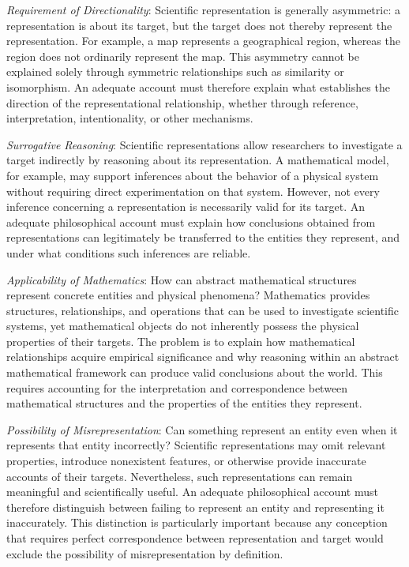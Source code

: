 \emph{Requirement of Directionality}: Scientific representation is generally asymmetric: a representation is about its target, but the target does not thereby represent the representation. For example, a map represents a geographical region, whereas the region does not ordinarily represent the map. This asymmetry cannot be explained solely through symmetric relationships such as similarity or isomorphism. An adequate account must therefore explain what establishes the direction of the representational relationship, whether through reference, interpretation, intentionality, or other mechanisms.

\emph{Surrogative Reasoning}: Scientific representations allow researchers to investigate a target indirectly by reasoning about its representation. A mathematical model, for example, may support inferences about the behavior of a physical system without requiring direct experimentation on that system. However, not every inference concerning a representation is necessarily valid for its target. An adequate philosophical account must explain how conclusions obtained from representations can legitimately be transferred to the entities they represent, and under what conditions such inferences are reliable.

\emph{Applicability of Mathematics}: How can abstract mathematical structures represent concrete entities and physical phenomena? Mathematics provides structures, relationships, and operations that can be used to investigate scientific systems, yet mathematical objects do not inherently possess the physical properties of their targets. The problem is to explain how mathematical relationships acquire empirical significance and why reasoning within an abstract mathematical framework can produce valid conclusions about the world. This requires accounting for the interpretation and correspondence between mathematical structures and the properties of the entities they represent.

\emph{Possibility of Misrepresentation}: Can something represent an entity even when it represents that entity incorrectly? Scientific representations may omit relevant properties, introduce nonexistent features, or otherwise provide inaccurate accounts of their targets. Nevertheless, such representations can remain meaningful and scientifically useful. An adequate philosophical account must therefore distinguish between failing to represent an entity and representing it inaccurately. This distinction is particularly important because any conception that requires perfect correspondence between representation and target would exclude the possibility of misrepresentation by definition.

